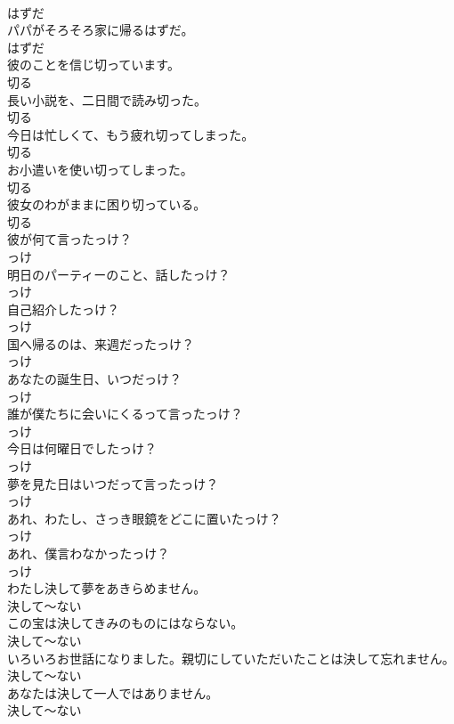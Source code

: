 \documentclass[8pt]{extreport}
\begin{document}
\begin{CJK}{UTF8}{min}
\\	はずだ	
\\	パパがそろそろ家に帰るはずだ。	
\\	はずだ	
\\	彼のことを信じ切っています。	
\\	切る	
\\	長い小説を、二日間で読み切った。	
\\	切る	
\\	今日は忙しくて、もう疲れ切ってしまった。	
\\	切る	
\\	お小遣いを使い切ってしまった。	
\\	切る	
\\	彼女のわがままに困り切っている。	
\\	切る	
\\	彼が何て言ったっけ？	
\\	っけ	
\\	明日のパーティーのこと、話したっけ？	
\\	っけ	
\\	自己紹介したっけ？	
\\	っけ	
\\	国へ帰るのは、来週だったっけ？	
\\	っけ	
\\	あなたの誕生日、いつだっけ？	
\\	っけ	
\\	誰が僕たちに会いにくるって言ったっけ？	
\\	っけ	
\\	今日は何曜日でしたっけ？	
\\	っけ	
\\	夢を見た日はいつだって言ったっけ？	
\\	っけ	
\\	あれ、わたし、さっき眼鏡をどこに置いたっけ？	
\\	っけ	
\\	あれ、僕言わなかったっけ？	
\\	っけ	
\\	わたし決して夢をあきらめません。	
\\	決して～ない	
\\	この宝は決してきみのものにはならない。	
\\	決して～ない	
\\	いろいろお世話になりました。親切にしていただいたことは決して忘れません。	
\\	決して～ない	
\\	あなたは決して一人ではありません。	
\\	決して～ない	

\end{CJK}
\end{document}
